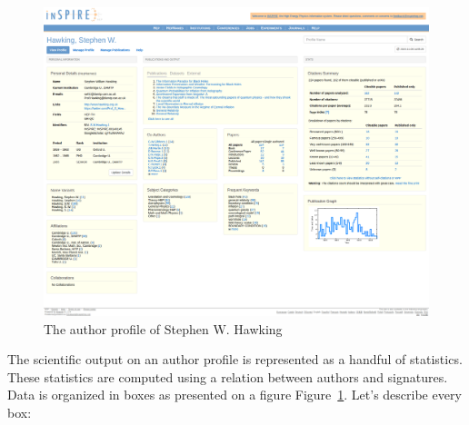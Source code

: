 \documentclass{pracamgr}
\begin{document}
\begin{figure}[!ht]
\includegraphics[width=\textwidth]{figures/profile}
\caption{The author profile of Stephen W. Hawking}
\label{fig:hawking}
\end{figure}


The scientific output on an author profile is represented as a handful of statistics. These statistics are computed using a relation between authors and signatures. Data is organized in boxes as presented on a figure Figure~\ref{fig:hawking}. Let's describe every box:
\end{document}
